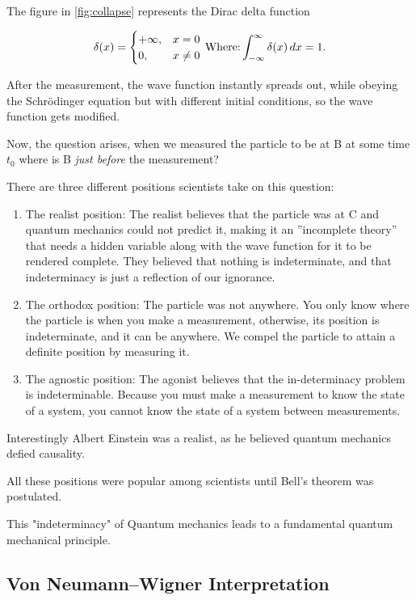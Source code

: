 \documentclass{article}
\begin{document}
The figure in \ref{fig:collapse} represents the Dirac delta function

\begin{equation}
    \delta (x)={\begin{cases}+\infty ,&x=0\\0,&x\neq 0\end{cases}}
    \label{eq:4}\\
    \ \text{Where:} \int _{-\infty }^{\infty }\delta (x)\,dx=1.
\end{equation}



After the measurement, the wave function instantly spreads out, while obeying the Schr\"{o}dinger equation but with different initial conditions, so the wave function gets modified.

Now, the question arises, when we measured the particle to be at B at some time $t_0$ where is B \textit{just before} the measurement?

There are three different positions scientists take on this question:
\begin{enumerate}
\item The realist position: The realist believes that the particle was at C and quantum mechanics could not predict it, making it an ”incomplete theory” that needs a hidden variable along with the wave function for it to be rendered complete. They believed that nothing is indeterminate, and that indeterminacy is just a reflection of our ignorance. 
\item The orthodox position: The particle was not anywhere. You only know where the particle is when you make a measurement, otherwise, its position is indeterminate, and it can be anywhere. We compel the particle to attain a definite position by measuring it. 
\item The agnostic position: The agonist believes that the in-determinacy problem is indeterminable. Because you must make a measurement to know the state of a system, you cannot know the state of a system between measurements. 
\end{enumerate}
Interestingly Albert Einstein was a realist, as he believed quantum mechanics defied causality.

All these positions were popular among scientists until Bell's theorem was postulated.


This "indeterminacy" of Quantum mechanics leads to a fundamental quantum mechanical principle.


\subsection{Von Neumann–Wigner Interpretation}
\end{document}
